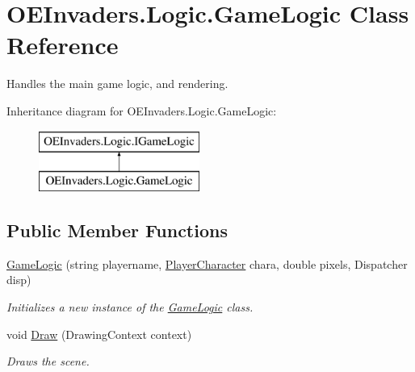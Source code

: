\hypertarget{class_o_e_invaders_1_1_logic_1_1_game_logic}{}\section{O\+E\+Invaders.\+Logic.\+Game\+Logic Class Reference}
\label{class_o_e_invaders_1_1_logic_1_1_game_logic}


Handles the main game logic, and rendering.  


Inheritance diagram for O\+E\+Invaders.\+Logic.\+Game\+Logic\+:\begin{figure}[H]
\begin{center}
\leavevmode
\includegraphics[height=2.000000cm]{class_o_e_invaders_1_1_logic_1_1_game_logic}
\end{center}
\end{figure}
\subsection*{Public Member Functions}
\begin{DoxyCompactItemize}
\item 
\mbox{\hyperlink{class_o_e_invaders_1_1_logic_1_1_game_logic_a238d378cb79529c74d2c704dbfb85a6c}{Game\+Logic}} (string playername, \mbox{\hyperlink{namespace_o_e_invaders_1_1_library_ad161194088b9101570c071d1baa1d2c7}{Player\+Character}} chara, double pixels, Dispatcher disp)
\begin{DoxyCompactList}\small\item\em Initializes a new instance of the \mbox{\hyperlink{class_o_e_invaders_1_1_logic_1_1_game_logic}{Game\+Logic}} class. \end{DoxyCompactList}\item 
void \mbox{\hyperlink{class_o_e_invaders_1_1_logic_1_1_game_logic_a1c3170ab17c07442cefa33edc6e4f2f2}{Draw}} (Drawing\+Context context)
\begin{DoxyCompactList}\small\item\em Draws the scene. \end{DoxyCompactList}\end{DoxyCompactItemize}
